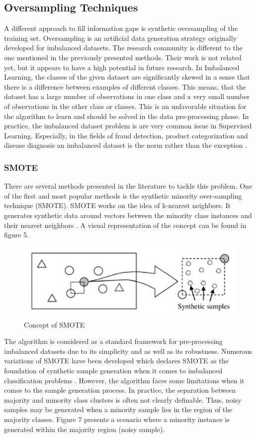 \documentclass[parskip=full]{scrartcl}
\begin{document}
\subsection{Oversampling Techniques}

A different approach to fill information gaps is synthetic oversampling of the
training set. Oversampling is an artificial data generation strategy originally
developed for imbalanced datasets. The research community is different to the
one mentioned in the previously presented methods. Their work is not related
yet, but it appears to have a high potential in future research. In Imbalanced
Learning, the classes of the given dataset are significantly skewed in a sense
that there is a difference between examples of different classes. This means,
that the dataset has a large number of observations in one class and a very
small number of observations in the other class or classes. This is an
unfavorable situation for the algorithm to learn and should be solved in the
data pre-processing phase. In practice, the imbalanced dataset problem is are
very common issue in Supervised Learning. Especially, in the fields of fraud
detection, product categorization and disease diagnosis an imbalanced dataset is
the norm rather than the exception \cite{He.2013}. 

\subsubsection{SMOTE}

There are several methods presented in the literature to tackle this problem.
One of the first and most popular methods is the synthetic minority
over-sampling technique (SMOTE). SMOTE works on the idea of k-nearest
neighbors. It generates synthetic data around vectors between the minority
class instances and their nearest neighbors \cite{Chawla.2002}. A visual
representation of the concept can be found in figure 5.

\begin{figure}[H]
	\centering
	\includegraphics[width=0.5\linewidth]{./Resources/smote}
	\caption{Concept of SMOTE}
	\label{fig:smote}
\end{figure}

The algorithm is considered as a standard framework for pre-processing
imbalanced datasets due to its simplicity and as well as its robustness.
Numerous variations of SMOTE have been developed which declares SMOTE as the
foundation of synthetic sample generation when it comes to imbalanced
classification problems \cite{Fernandez.2018}. However, the algorithm faces some
limitations when it comes to the sample generation process. In practice, the
separation between majority and minority class clusters is often not clearly
definable. Thus, noisy samples may be generated when a minority sample lies in
the region of the majority classes. Figure 7 presents a scenario where a
minority instance is generated within the majority region (noisy sample).
\end{document}
